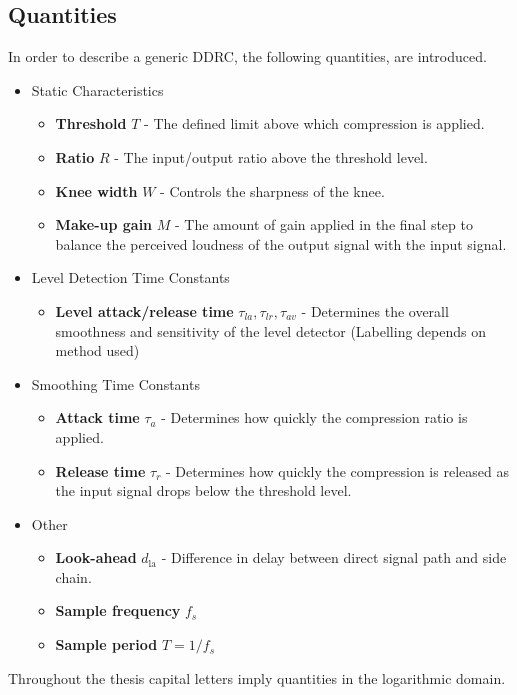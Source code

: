 \documentclass[../main2.tex]{subfiles}
\begin{document}
\subsection{Quantities}\label{theory_definitions}
In order to describe a generic DDRC, the following quantities, are introduced.
\begin{itemize}
\item{Static Characteristics}
	\begin{itemize}
	\item \textbf{Threshold} $T$ - The defined limit above which compression is applied.
	\item \textbf{Ratio} $R$ - The input/output ratio above the threshold level.
	\item \textbf{Knee width}  $W$ - Controls the sharpness of the knee.
	\item \textbf{Make-up gain}  $M$ - The amount of gain applied in the final step to balance the perceived loudness of the output signal with the input signal.
\end{itemize}
\item{Level Detection Time Constants}
	\begin{itemize}
	\item \textbf{Level attack/release time} $\tau_{la}, \tau_{lr}, \tau_{av}$ - Determines the overall smoothness and sensitivity of the level detector (Labelling depends on method used)
	\end{itemize}
\item{Smoothing Time Constants}
	\begin{itemize}
	\item \textbf{Attack time} $\tau_{a}$ - Determines how quickly the compression ratio is applied.
	\item \textbf{Release time} $\tau_{r}$ - Determines how quickly the compression is released as the input signal drops below the threshold level.
	\end{itemize}
\item{Other}
	\begin{itemize}
	\item \textbf{Look-ahead} $d_\text{la}$ - Difference in delay between direct signal path and side chain. 
	\item \textbf{Sample frequency} $f_s$
	\item \textbf{Sample period} $T = 1/f_s$
	\end{itemize}
\end{itemize}
Throughout the thesis capital letters imply quantities in the logarithmic domain. 
\end{document}
